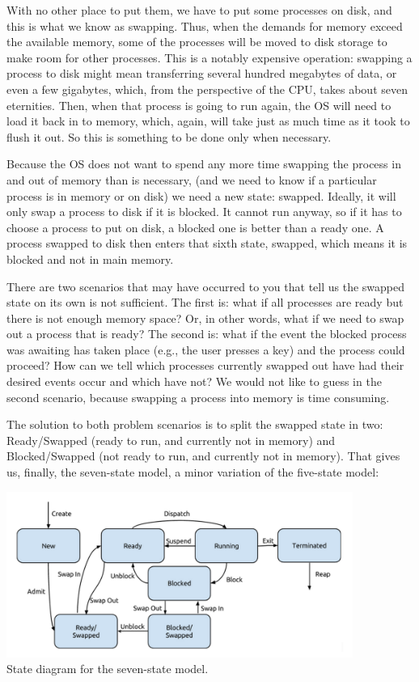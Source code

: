 \documentclass[a4paper]{report}
\begin{document}
With no other place to put them, we have to put some processes on disk, and this is what we know as swapping. Thus, when the demands for memory exceed the available memory, some of the processes will be moved to disk storage to make room for other processes. This is a notably expensive operation: swapping a process to disk might mean transferring several hundred megabytes of data, or even a few gigabytes, which, from the perspective of the CPU, takes about seven eternities. Then, when that process is going to run again, the OS will need to load it back in to memory, which, again, will take just as much time as it took to flush it out. So this is something to be done only when necessary.

Because the OS does not want to spend any more time swapping the process in and out of memory than is necessary, (and we need to know if a particular process is in memory or on disk) we need a new state: swapped.  Ideally, it will only swap a process to disk if it is blocked. It cannot run anyway, so if it has to choose a process to put on disk, a blocked one is better than a ready one. A process swapped to disk then enters that sixth state, swapped, which means it is blocked and not in main memory.

There are two scenarios that may have occurred to you that tell us the swapped state on its own is not sufficient. The first is: what if all processes are ready but there is not enough memory space? Or, in other words, what if we need to swap out a process that is ready? The second is: what if the event the blocked process was awaiting has taken place (e.g., the user presses a key) and the process could proceed? How can we tell which processes currently swapped out have had their desired events occur and which have not? We would not like to guess in the second scenario, because swapping a process into memory is time consuming.

The solution to both problem scenarios is to split the swapped state in two: Ready/Swapped (ready to run, and currently not in memory) and Blocked/Swapped (not ready to run, and currently not in memory). That gives us, finally, the seven-state model, a minor variation of the five-state model:

\begin{center}
	\includegraphics[width=0.85\textwidth]{images/7-state-model.png}\\
	State diagram for the seven-state model.
\end{center}
\end{document}
